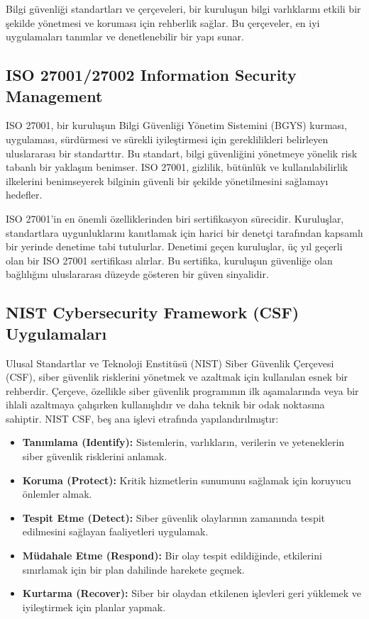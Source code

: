 Bilgi güvenliği standartları ve çerçeveleri, bir kuruluşun bilgi varlıklarını etkili bir şekilde yönetmesi ve koruması için rehberlik sağlar. Bu çerçeveler, en iyi uygulamaları tanımlar ve denetlenebilir bir yapı sunar.

\subsection{ISO 27001/27002 Information Security Management}

ISO 27001, bir kuruluşun Bilgi Güvenliği Yönetim Sistemini (BGYS) kurması, uygulaması, sürdürmesi ve sürekli iyileştirmesi için gereklilikleri belirleyen uluslararası bir standarttır. Bu standart, bilgi güvenliğini yönetmeye yönelik risk tabanlı bir yaklaşım benimser. ISO 27001, gizlilik, bütünlük ve kullanılabilirlik ilkelerini benimseyerek bilginin güvenli bir şekilde yönetilmesini sağlamayı hedefler.

ISO 27001'in en önemli özelliklerinden biri sertifikasyon sürecidir. Kuruluşlar, standartlara uygunluklarını kanıtlamak için harici bir denetçi tarafından kapsamlı bir yerinde denetime tabi tutulurlar. Denetimi geçen kuruluşlar, üç yıl geçerli olan bir ISO 27001 sertifikası alırlar. Bu sertifika, kuruluşun güvenliğe olan bağlılığını uluslararası düzeyde gösteren bir güven sinyalidir.

\subsection{NIST Cybersecurity Framework (CSF) Uygulamaları}

Ulusal Standartlar ve Teknoloji Enstitüsü (NIST) Siber Güvenlik Çerçevesi (CSF), siber güvenlik risklerini yönetmek ve azaltmak için kullanılan esnek bir rehberdir. Çerçeve, özellikle siber güvenlik programının ilk aşamalarında veya bir ihlali azaltmaya çalışırken kullanışlıdır ve daha teknik bir odak noktasına sahiptir. NIST CSF, beş ana işlevi etrafında yapılandırılmıştır:

\begin{itemize}
    \item \textbf{Tanımlama (Identify):} Sistemlerin, varlıkların, verilerin ve yeteneklerin siber güvenlik risklerini anlamak.
    \item \textbf{Koruma (Protect):} Kritik hizmetlerin sunumunu sağlamak için koruyucu önlemler almak.
    \item \textbf{Tespit Etme (Detect):} Siber güvenlik olaylarının zamanında tespit edilmesini sağlayan faaliyetleri uygulamak.
    \item \textbf{Müdahale Etme (Respond):} Bir olay tespit edildiğinde, etkilerini sınırlamak için bir plan dahilinde harekete geçmek.
    \item \textbf{Kurtarma (Recover):} Siber bir olaydan etkilenen işlevleri geri yüklemek ve iyileştirmek için planlar yapmak.
\end{itemize}

